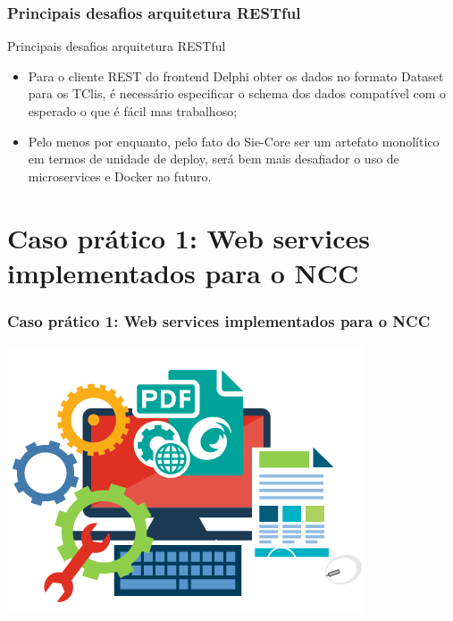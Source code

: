 \documentclass{beamer}
\begin{document}
\begin{frame}
\frametitle{Principais desafios arquitetura RESTful}

\begin{exampleblock}{Principais desafios arquitetura RESTful}
\small{
	\begin{itemize}
		\item<1->Para o cliente REST do frontend Delphi obter os dados no formato Dataset para os TClis, é necessário especificar o schema dos dados compatível com o esperado o que é fácil mas trabalhoso;
		\item<1->Pelo menos por enquanto, pelo fato do Sie-Core ser um artefato monolítico em termos de unidade de deploy, será bem mais desafiador o uso de microservices e Docker no futuro.
	\end{itemize}
}
\end{exampleblock}

\end{frame}





\section{Caso prático 1: Web services implementados para o NCC}



\begin{frame}
  \frametitle{Caso prático 1: Web services implementados para o NCC}

	\centering
	\includegraphics[scale=0.4]{img/sdk.png}
  
\end{frame}
\end{document}
